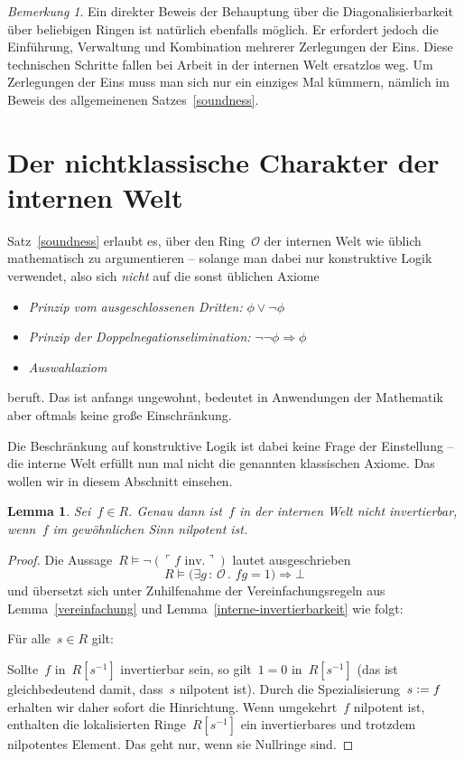 \documentclass[a4paper,ngerman,12pt]{scrartcl}
\theoremstyle{definition}
\theoremstyle{plain}
\newtheorem{lemma}[defn]{Lemma}
\theoremstyle{remark}
\newtheorem{bem}[defn]{Bemerkung}
\renewcommand{\O}{\mathcal{O}}
\renewcommand{\_}{\mathpunct{.}\,}
\newcommand{\?}{\,{:}\,}
\newcommand{\speak}[1]{\ulcorner\text{#1}\urcorner}
\newcommand{\defeq}{\vcentcolon=}
\newenvironment{indentblock}{%
  \list{}{\leftmargin\leftmargin}%
  \item\relax
}{%
  \endlist
}
\begin{document}
\begin{bem}Ein direkter Beweis der Behauptung über die Diagonalisierbarkeit
über beliebigen Ringen ist natürlich ebenfalls möglich. Er erfordert jedoch
die Einführung, Verwaltung und Kombination mehrerer Zerlegungen der Eins. Diese
technischen Schritte fallen bei Arbeit in der internen Welt ersatzlos weg. Um
Zerlegungen der Eins muss man sich nur ein einziges Mal kümmern, nämlich im
Beweis des allgemeinenen Satzes~\ref{soundness}.\end{bem}


\section{Der nichtklassische Charakter der internen Welt}

Satz~\ref{soundness} erlaubt es, über den Ring~$\O$ der internen Welt
wie üblich mathematisch zu argumentieren -- solange man dabei nur konstruktive
Logik verwendet, also sich \emph{nicht} auf die sonst üblichen Axiome
\begin{itemize}
\item \emph{Prinzip vom ausgeschlossenen Dritten:} $\phi \vee \neg\phi$
\item \emph{Prinzip der Doppelnegationselimination:} $\neg\neg\phi \Rightarrow
\phi$
\item \emph{Auswahlaxiom}
\end{itemize}
beruft. Das ist anfangs ungewohnt, bedeutet in Anwendungen der Mathematik aber
oftmals keine große Einschränkung.

Die Beschränkung auf konstruktive Logik ist dabei keine Frage der Einstellung
-- die interne Welt erfüllt nun mal nicht die genannten klassischen Axiome. Das
wollen wir in diesem Abschnitt einsehen.

\begin{lemma}Sei~$f \in R$. Genau dann ist~$f$ in der internen Welt nicht
invertierbar, wenn~$f$ im gewöhnlichen Sinn nilpotent ist.\end{lemma}
\begin{proof}Die Aussage~$R \models \neg(\speak{$f$ inv.})$ lautet ausgeschrieben
\[ R \models \bigl(\exists g\?\O\_ fg = 1\bigr) \Rightarrow \bot \]
und übersetzt sich unter Zuhilfenahme der Vereinfachungsregeln aus Lemma~\ref{vereinfachung}
und Lemma~\ref{interne-invertierbarkeit} wie folgt:
\begin{indentblock}
Für alle~$s \in R$ gilt:
\begin{indentblock}
Sollte~$f$ in~$R[s^{-1}]$ invertierbar sein, so gilt~$1 = 0$ in~$R[s^{-1}]$
(das ist gleichbedeutend damit, dass~$s$ nilpotent ist).
\end{indentblock}
\end{indentblock}
Durch die Spezialisierung~$s \defeq f$ erhalten wir daher sofort die Hinrichtung.
Wenn umgekehrt~$f$ nilpotent ist, enthalten die lokalisierten Ringe~$R[s^{-1}]$
ein invertierbares und trotzdem nilpotentes Element. Das geht nur, wenn sie
Nullringe sind.
\end{proof}
\end{document}
